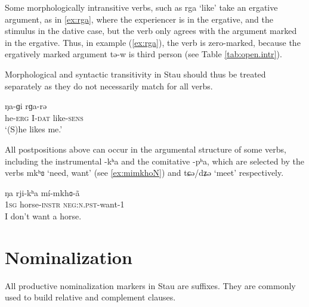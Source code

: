\documentclass[oneside,a4paper,11pt]{article}
\newcommand{\ipa}[1]{{\phon#1}} %
\begin{document}
Some morphologically intransitive verbs, such as \ipa{rga} `like' take an ergative argument, as in \ref{ex:rga}, where the experiencer is in the ergative, and the stimulus in the dative case, but the verb only agrees with the argument marked in the ergative. Thus, in example (\ref{ex:rga}), the verb is zero-marked, because the ergatively marked argument \ipa{tə-w} is third person (see Table \ref{tab:open.intr}).

 Morphological and syntactic transitivity in Stau should thus be treated separately as they do not necessarily match for all verbs.

 \begin{exe}
\ex \label{ex:rga}
\gll \ipa{tə-w}  	\ipa{ŋa-ɡi}  	\ipa{rɡa-rə}  
 \\
he-\textsc{erg} I-\textsc{dat} like-\textsc{sens} \\
\glt `(S)he likes me.'
\end{exe}

All postpositions above can occur in the argumental structure of some verbs, including the instrumental \ipa{-kʰa} and the comitative \ipa{-pʰa}, which are selected by the verbs \ipa{mkʰɞ} `need, want' (see \ref{ex:mimkhoN}) and \ipa{tɕə/dʑə} `meet' respectively.

 \begin{exe}
\ex \label{ex:mimkhoN}
\gll
\ipa{ŋa} 	\ipa{rji-kʰa} 	\ipa{mí-mkhɞ-ã} \\
\textsc{1sg} horse-\textsc{instr} \textsc{neg:n.pst}-want-1 \\
\glt I don't want a horse.
\end{exe}

%	


 


%
%
%
%
%
%

%


\section{Nominalization} \label{sec:nmlz}
All productive nominalization markers in Stau are suffixes. They are commonly used to build relative and complement clauses.
\end{document}
